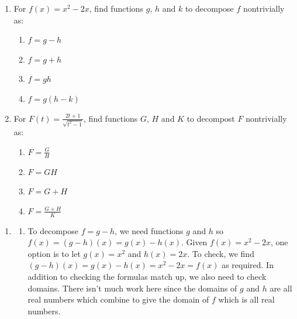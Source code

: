 \documentclass{ximera}
\begin{document}
\begin{example} \label{funcarithdecompex}  

\begin{enumerate}

\item  For  $f(x) = x^2 - 2x$, find functions $g$, $h$ and $k$ to decompose $f$ nontrivially as:

\begin{enumerate}

\item  $f = g-h$

\item  $f = g+h$

\item  $f = gh$

\item  $f = g(h-k)$

\end{enumerate}

\item  For $F(t) = \frac{2t+1}{\sqrt{t^2-1}}$, find functions $G$, $H$ and $K$ to decompost $F$ nontrivially as:

\begin{enumerate}

\item  $F = \frac{G}{H}$ 

\item  $F = GH$ 

\item  $F = G+H$ 

\item  $F =  \frac{G+H}{K}$ 

\end{enumerate}

\end{enumerate}

\begin{explanation}

\begin{enumerate}

\item 

\begin{enumerate}

\item To decompose $f = g-h$, we need functions $g$ and $h$ so $f(x) = (g-h)(x) = g(x) - h(x)$.  Given $f(x) = x^2 - 2x$,  one option is to let $g(x) = x^2$ and $h(x) = 2x$.  To check, we find $(g-h)(x) = g(x) - h(x) = x^2-2x = f(x)$ as required.  In addition to checking the formulas match up, we also need to check domains.  There isn't much work here since the domains of $g$ and $h$ are all real numbers which combine to give the domain of $f$ which is all real numbers.


\end{enumerate}
\end{enumerate}
\end{explanation}
\end{example}
\end{document}
